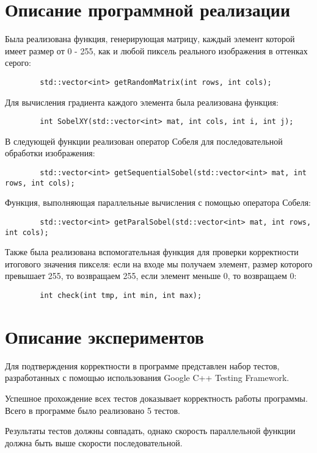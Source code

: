 \documentclass{report}
\begin{document}
	\newpage

	\section*{Описание программной реализации}
	Была реализована функция, генерирующая матрицу, каждый элемент которой имеет размер от 0 - 255, как и любой пиксель реального изображения в оттенках серого:
	\begin{lstlisting}
		std::vector<int> getRandomMatrix(int rows, int cols);
	\end{lstlisting}
	\par Для вычисления градиента каждого элемента была реализована функция:
	\begin{lstlisting}
		int SobelXY(std::vector<int> mat, int cols, int i, int j);
	\end{lstlisting}
	\par В следующей функции реализован оператор Собеля для последовательной обработки изображения:
	\begin{lstlisting}
		std::vector<int> getSequentialSobel(std::vector<int> mat, int rows, int cols);
	\end{lstlisting}
	\par Функция, выполняющая параллельные вычисления с помощью оператора Собеля:
	\begin{lstlisting}
		std::vector<int> getParalSobel(std::vector<int> mat, int rows, int cols);
	\end{lstlisting}
	\par Также была реализована вспомогательная функция для проверки корректности итогового значения пикселя: если на входе мы получаем элемент, размер которого превышает 255, то возвращаем 255, если элемент меньше 0, то возвращаем 0:
	\begin{lstlisting}
		int check(int tmp, int min, int max);
	\end{lstlisting}
	\newpage

	\section*{Описание экспериментов}
	Для подтверждения корректности в программе представлен набор тестов, разработанных с помощью использования Google C++ Testing Framework.
	\par Успешное прохождение всех тестов доказывает корректность работы программы. Всего в программе было реализовано 5 тестов.
	\par Результаты тестов должны совпадать, однако скорость параллельной функции должна быть выше скорости последовательной.
	\newpage
\end{document}
